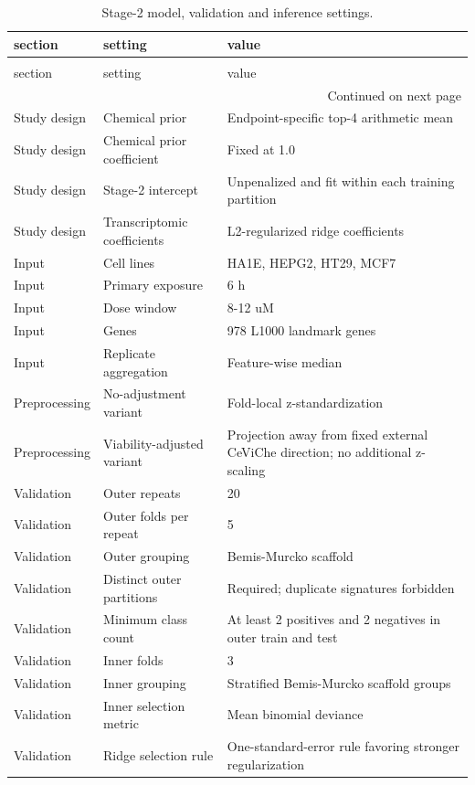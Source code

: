 \begin{longtable}{lll}
\caption{Stage-2 model, validation and inference settings.} \label{tab:stage2_settings} \\
\toprule
section & setting & value \\
\midrule
\endfirsthead
\caption[]{Stage-2 model, validation and inference settings.} \\
\toprule
section & setting & value \\
\midrule
\endhead
\midrule
\multicolumn{3}{r}{Continued on next page} \\
\midrule
\endfoot
\bottomrule
\endlastfoot
Study design & Chemical prior & Endpoint-specific top-4 arithmetic mean \\
Study design & Chemical prior coefficient & Fixed at 1.0 \\
Study design & Stage-2 intercept & Unpenalized and fit within each training partition \\
Study design & Transcriptomic coefficients & L2-regularized ridge coefficients \\
Input & Cell lines & HA1E, HEPG2, HT29, MCF7 \\
Input & Primary exposure & 6 h \\
Input & Dose window & 8-12 uM \\
Input & Genes & 978 L1000 landmark genes \\
Input & Replicate aggregation & Feature-wise median \\
Preprocessing & No-adjustment variant & Fold-local z-standardization \\
Preprocessing & Viability-adjusted variant & Projection away from fixed external CeViChe direction; no additional z-scaling \\
Validation & Outer repeats & 20 \\
Validation & Outer folds per repeat & 5 \\
Validation & Outer grouping & Bemis-Murcko scaffold \\
Validation & Distinct outer partitions & Required; duplicate signatures forbidden \\
Validation & Minimum class count & At least 2 positives and 2 negatives in outer train and test \\
Validation & Inner folds & 3 \\
Validation & Inner grouping & Stratified Bemis-Murcko scaffold groups \\
Validation & Inner selection metric & Mean binomial deviance \\
Validation & Ridge selection rule & One-standard-error rule favoring stronger regularization \\

\end{longtable}
